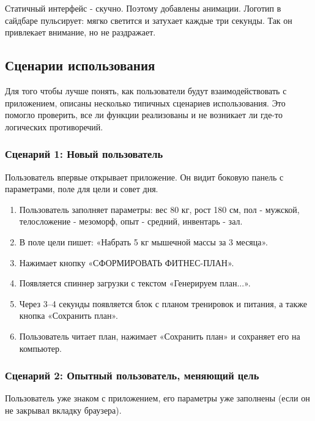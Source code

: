 \documentclass[14pt, a4paper]{extarticle}
\begin{document}
\begin{enumerate}
\noindent Статичный интерфейс - скучно. Поэтому добавлены анимации. Логотип в сайдбаре пульсирует: мягко светится и затухает каждые три секунды. Так он привлекает внимание, но не раздражает.
\vskip 5cm
\subsection{Сценарии использования}

\noindent Для того чтобы лучше понять, как пользователи будут взаимодействовать с приложением, описаны несколько типичных сценариев использования. Это помогло проверить, все ли функции реализованы и не возникает ли где-то логических противоречий.

\subsubsection{Сценарий 1: Новый пользователь}

\noindent Пользователь впервые открывает приложение. Он видит боковую панель с параметрами, поле для цели и совет дня.

\begin{enumerate}
\item Пользователь заполняет параметры: вес 80 кг, рост 180 см, пол - мужской, телосложение - мезоморф, опыт - средний, инвентарь - зал.

\item В поле цели пишет: «Набрать 5 кг мышечной массы за 3 месяца».

\item Нажимает кнопку «СФОРМИРОВАТЬ ФИТНЕС-ПЛАН».

\item Появляется спиннер загрузки с текстом «Генерируем план...».

\item Через 3–4 секунды появляется блок с планом тренировок и питания, а также кнопка «Сохранить план».

\item Пользователь читает план, нажимает «Сохранить план» и сохраняет его на компьютер.
\end{enumerate}

\subsubsection{Сценарий 2: Опытный пользователь, меняющий цель}

\noindent Пользователь уже знаком с приложением, его параметры уже заполнены (если он не закрывал вкладку браузера).


\end{enumerate}
\end{document}
